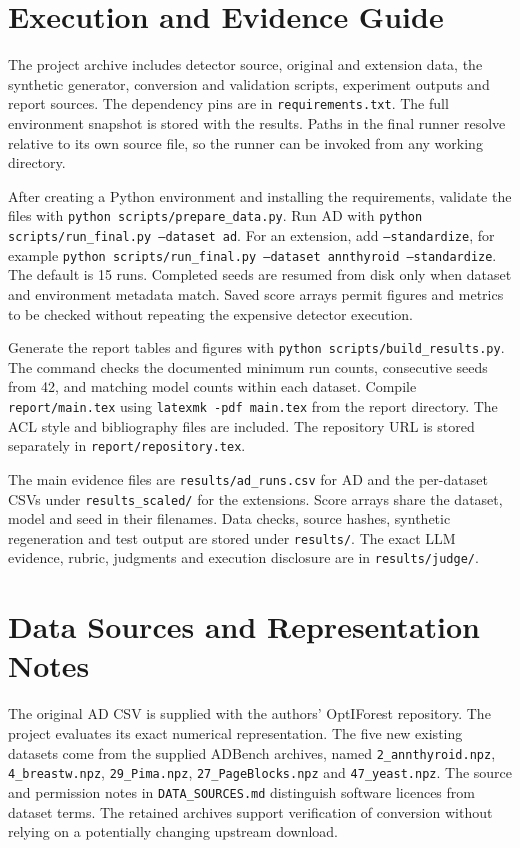 \documentclass[11pt]{article}
\begin{document}
\clearpage

\clearpage
\appendix
\section{Execution and Evidence Guide}
The project archive includes detector source, original and extension data, the synthetic generator, conversion and validation scripts, experiment outputs and report sources. The dependency pins are in \texttt{requirements.txt}. The full environment snapshot is stored with the results. Paths in the final runner resolve relative to its own source file, so the runner can be invoked from any working directory.

After creating a Python environment and installing the requirements, validate the files with \texttt{python scripts/prepare\_data.py}. Run AD with \texttt{python scripts/run\_final.py --dataset ad}. For an extension, add \texttt{--standardize}, for example \texttt{python scripts/run\_final.py --dataset annthyroid --standardize}. The default is 15 runs. Completed seeds are resumed from disk only when dataset and environment metadata match. Saved score arrays permit figures and metrics to be checked without repeating the expensive detector execution.

Generate the report tables and figures with \texttt{python scripts/build\_results.py}. The command checks the documented minimum run counts, consecutive seeds from 42, and matching model counts within each dataset. Compile \texttt{report/main.tex} using \texttt{latexmk -pdf main.tex} from the report directory. The ACL style and bibliography files are included. The repository URL is stored separately in \texttt{report/repository.tex}.

The main evidence files are \texttt{results/ad\_runs.csv} for AD and the per-dataset CSVs under \texttt{results\_scaled/} for the extensions. Score arrays share the dataset, model and seed in their filenames. Data checks, source hashes, synthetic regeneration and test output are stored under \texttt{results/}. The exact LLM evidence, rubric, judgments and execution disclosure are in \texttt{results/judge/}.




\section{Data Sources and Representation Notes}
The original AD CSV is supplied with the authors' OptIForest repository. The project evaluates its exact numerical representation. The five new existing datasets come from the supplied ADBench archives, named \texttt{2\_annthyroid.npz}, \texttt{4\_breastw.npz}, \texttt{29\_Pima.npz}, \texttt{27\_PageBlocks.npz} and \texttt{47\_yeast.npz}. The source and permission notes in \texttt{DATA\_SOURCES.md} distinguish software licences from dataset terms. The retained archives support verification of conversion without relying on a potentially changing upstream download.
\end{document}
